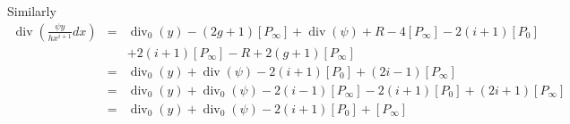 \documentclass[draft, 11pt]{article} %
\theoremstyle{plain}
\theoremstyle{remark}
\DeclareMathOperator{\di}{div}
\begin{document}
Similarly 
\begin{eqnarray*}
\di \left( \frac{\psi y}{hx^{i+1}} dx \right) & = & \di_0(y) -(2g+1)[P_\infty] + \di(\psi) +R -4[P_\infty] - 2(i+1)[P_0] \\
& ~ & + 2(i+1)[P_\infty] - R + 2(g+1)[P_\infty] \\
& = & \di_0(y) + \di(\psi) -2(i+1)[P_0] + (2i-1)[P_\infty] \\
& = & \di_0(y) + \di_0(\psi) - 2(i-1)[P_\infty] - 2(i+1)[P_0] + (2i+1)[P_\infty] \\
& = & \di_0(y) + \di_0(\psi) - 2(i+1)[P_0] + [P_\infty]
\end{eqnarray*}


%

\end{document}
